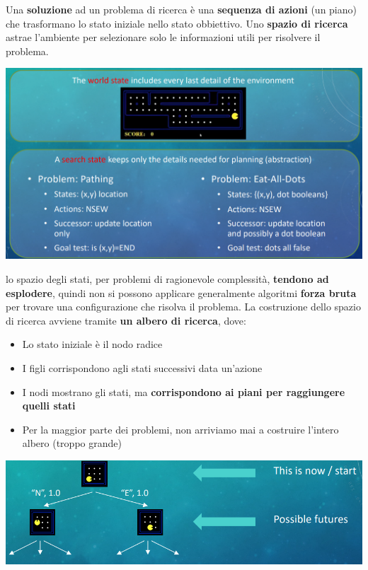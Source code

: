 \documentclass[12pt]{article}
\begin{document}
Una \textbf{soluzione} ad un problema di ricerca è una \textbf{sequenza di azioni} (un piano) che trasformano lo stato iniziale nello stato obbiettivo.
Uno \textbf{spazio di ricerca} astrae l'ambiente per selezionare solo le informazioni utili per risolvere il problema.
\begin{center}
    \includegraphics[width = 1\linewidth]{Images/13.PNG}
\end{center}
lo spazio degli stati, per problemi di ragionevole complessità, \textbf{tendono ad esplodere}, quindi non si possono applicare generalmente algoritmi \textbf{forza bruta} per trovare una configurazione che risolva il problema.
La costruzione dello spazio di ricerca avviene tramite \textbf{un albero di ricerca}, dove:
\begin{itemize}
    \item Lo stato iniziale è il nodo radice
    \item I figli corrispondono agli stati successivi data un'azione
    \item I nodi mostrano gli stati, ma \textbf{corrispondono ai piani per raggiungere quelli stati}
    \item Per la maggior parte dei problemi, non arriviamo mai a costruire l'intero albero (troppo grande)
\end{itemize}
\begin{center}
    \includegraphics[width = 1\linewidth]{Images/14.PNG}
\end{center}
\end{document}
